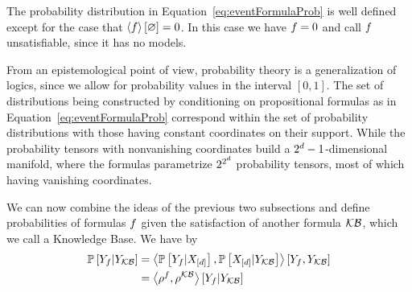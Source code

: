 % 
The probability distribution in Equation~\eqref{eq:eventFormulaProb} is well defined except for the case that $\left\langle f\right\rangle \left[ \varnothing \right]=0$.
In this case we have $f=0$ and call $f$ unsatisfiable, since it has no models.




From an epistemological point of view, probability theory is a generalization of logics, since we allow for probability values in the interval $[0,1]$.
The set of distributions being constructed by conditioning on propositional formulas as in Equation~\eqref{eq:eventFormulaProb} correspond within the set of probability distributions with those having constant coordinates on their support.
While the probability tensors with nonvanishing coordinates build a $2^d-1$-dimensional manifold, where the formulas parametrize $2^{2^d}$ probability tensors, most of which having vanishing coordinates.





We can now combine the ideas of the previous two subsections and define probabilities of formulas $f$ given the satisfaction of another formula $\mathcal{KB}$, which we call a Knowledge Base.
We have by  %
\begin{align*}
	\mathbb{P}\left[Y_{f}|Y_{\mathcal{KB}}\right] 
	& = \left\langle 
	\mathbb{P}\left[Y_{f}|X_{[d]}\right], \mathbb{P}\left[X_{[d]}|Y_{\mathcal{KB}}\right]
	\right\rangle \left[ Y_{f},Y_{\mathcal{KB}} \right] \\
	& = \left\langle \rho^{f} , \rho^{\mathcal{KB}}\right\rangle \left[ Y_{f} | Y_{\mathcal{KB}} \right]
\end{align*}

